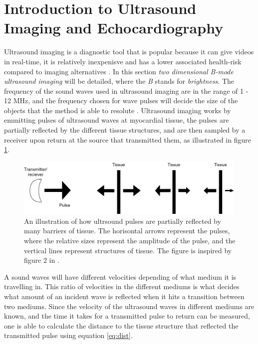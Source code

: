 \section{Introduction to Ultrasound Imaging and Echocardiography}

Ultrasound imaging is a diagnostic tool that is popular because it can give videos in real-time, it is relatively inexpenisve and has a lower associated health-risk compared to imaging alternatives \cite{medical_ultrasound_wikipedia}. In this section \textit{two dimensional B-mode ultrasound imaging} will be detailed, where the \textit{B} stands for \textit{brightness}. The frequency of the sound waves used in ultrasound imaging are in the range of 1 - 12 MHz, and the frequency chosen for wave pulses will decide the size of the objects that the method is able to resolute \cite{basic_ultrasound}. Ultrasound imaging works by emmitting pulses of ultrasound waves at myocardial tissue, the pulses are partially reflected by the different tissue structures, and are then sampled by a receiver upon return at the source that transmitted them, as illustrated in figure \ref{fig:us_reflect}.

\begin{figure}[H]
    \centering
    \includegraphics[width=0.99\textwidth]{echocardiography/US_reflection.png}
    \caption{An illustration of how ultrsound pulses are partially reflected by many barriers of tissue. The horisontal arrows represent the pulses, where the relative sizes represent the amplitude of the pulse, and the vertical lines represent structures of tissue. The figure is inspired by figure 2 in \cite{basic_ultrasound}.}
    \label{fig:us_reflect}
\end{figure}

A sound waves will have different velocities depending of what medium it is travelling in. This ratio of velocities in the different mediums is what decides what amount of an incident wave is reflected when it hits a transition between two mediums. Since the velocity of the ultrasound waves in different mediums are known, and the time it takes for a transmitted pulse to return can be measured, one is able to calculate the distance to the tissue structure that reflected the transmitted pulse using equation \eqref{eq:dist}. 

